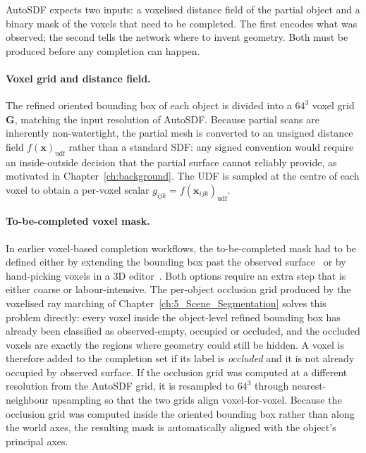 AutoSDF expects two inputs: a voxelised distance field of the partial object and a binary mask of the voxels that need to be completed. The first encodes what was observed; the second tells the network where to invent geometry. Both must be produced before any completion can happen.

\paragraph{Voxel grid and distance field.}
The refined oriented bounding box of each object is divided into a $64^3$ voxel grid $\mathbf{G}$, matching the input resolution of AutoSDF. Because partial scans are inherently non-watertight, the partial mesh is converted to an unsigned distance field $f(\mathbf{x})_\text{udf}$ rather than a standard SDF: any signed convention would require an inside-outside decision that the partial surface cannot reliably provide, as motivated in Chapter~\ref{ch:background}. The UDF is sampled at the centre of each voxel to obtain a per-voxel scalar $g_{ijk} = f(\mathbf{x}_{ijk})_\text{udf}$.

\paragraph{To-be-completed voxel mask.}
In earlier voxel-based completion workflows, the to-be-completed mask had to be defined either by extending the bounding box past the observed surface~\cite{mittal_autosdf_2022} or by hand-picking voxels in a 3D editor~\cite{wegen_interactive_2022, vermandere_guided_2025}. Both options require an extra step that is either coarse or labour-intensive. The per-object occlusion grid produced by the voxelised ray marching of Chapter~\ref{ch:5_Scene_Segmentation} solves this problem directly: every voxel inside the object-level refined bounding box has already been classified as observed-empty, occupied or occluded, and the occluded voxels are exactly the regions where geometry could still be hidden. A voxel is therefore added to the completion set if its label is \textit{occluded} and it is not already occupied by observed surface. If the occlusion grid was computed at a different resolution from the AutoSDF grid, it is resampled to $64^3$ through nearest-neighbour upsampling so that the two grids align voxel-for-voxel. Because the occlusion grid was computed inside the oriented bounding box rather than along the world axes, the resulting mask is automatically aligned with the object's principal axes.


